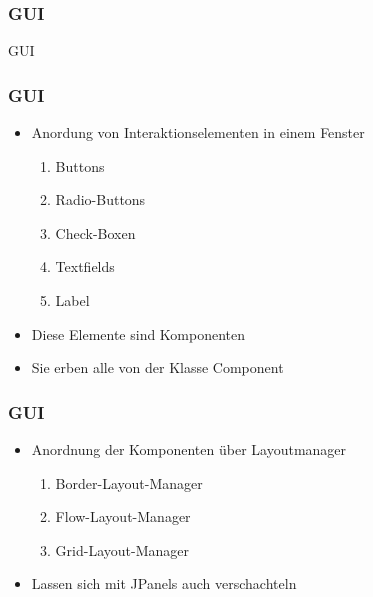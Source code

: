 \begin{frame}[fragile]
	\frametitle{GUI}
	\huge GUI
\end{frame} 

\begin{frame}[fragile]
	\frametitle{GUI}
	\begin{itemize}
	  \item Anordung von Interaktionselementen in einem Fenster
	  	\begin{enumerate}
	  	  \item Buttons
	  	  \item Radio-Buttons
	  	  \item Check-Boxen
	  	  \item Textfields
	  	  \item Label
	  	\end{enumerate}
	  \item Diese Elemente sind Komponenten
	  \item Sie erben alle von der Klasse Component
	\end{itemize}
\end{frame}

\begin{frame}[fragile]
	\frametitle{GUI}
	\begin{itemize}
	  \item Anordnung der Komponenten \"uber Layoutmanager
		  \begin{enumerate}
		  	  \item Border-Layout-Manager
		  	  \item Flow-Layout-Manager
		  	  \item Grid-Layout-Manager
		  	\end{enumerate}
	  \item Lassen sich mit JPanels auch verschachteln
	\end{itemize}
\end{frame} 

